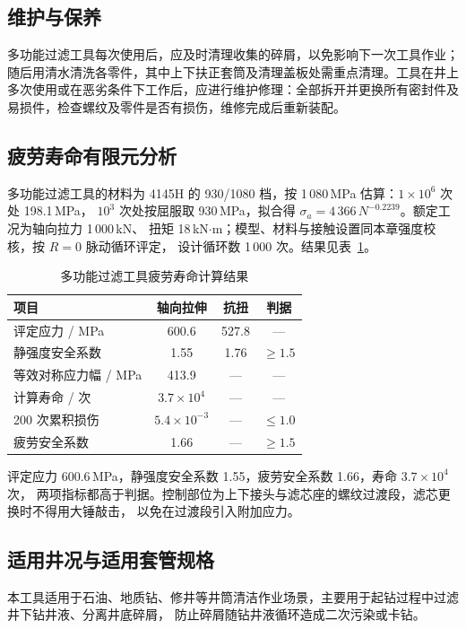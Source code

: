 \subsection{维护与保养}

多功能过滤工具每次使用后，应及时清理收集的碎屑，以免影响下一次工具作业；随后用清水清洗各零件，其中上下扶正套筒及清理盖板处需重点清理。工具在井上多次使用或在恶劣条件下工作后，应进行维护修理：全部拆开并更换所有密封件及易损件，检查螺纹及零件是否有损伤，维修完成后重新装配。


\subsection{疲劳寿命有限元分析}
多功能过滤工具的材料为 4145H 的 930/1080 档，按 1\,080\,MPa 估算：$1\times10^{6}$ 次处 198.1\,MPa，
$10^{3}$ 次处按屈服取 930\,MPa，拟合得 $\sigma_a=4\,366\,N^{-0.2239}$。额定工况为轴向拉力 1\,000\,kN、
扭矩 18\,kN$\cdot$m；模型、材料与接触设置同本章强度校核，按 $R=0$ 脉动循环评定，
设计循环数 1\,000 次。结果见表~\ref{tab:fatigue_filter}。

\begin{table}[htbp]
\centering
\caption{多功能过滤工具疲劳寿命计算结果}
\label{tab:fatigue_filter}
\begin{tabular}{lccc}
\hline
项目 & 轴向拉伸 & 抗扭 & 判据 \\
\hline
评定应力 / MPa & 600.6 & 527.8 & --- \\
静强度安全系数 & 1.55 & 1.76 & $\ge 1.5$ \\
等效对称应力幅 / MPa & 413.9 & --- & --- \\
计算寿命 / 次 & $3.7\times10^{4}$ & --- & --- \\
200 次累积损伤 & $5.4\times10^{-3}$ & --- & $\le 1.0$ \\
疲劳安全系数 & 1.66 & --- & $\ge 1.5$ \\
\hline
\end{tabular}
\end{table}

评定应力 600.6\,MPa，静强度安全系数 1.55，疲劳安全系数 1.66，寿命 $3.7\times10^{4}$ 次，
两项指标都高于判据。控制部位为上下接头与滤芯座的螺纹过渡段，滤芯更换时不得用大锤敲击，
以免在过渡段引入附加应力。

\subsection{适用井况与适用套管规格}

本工具适用于石油、地质钻、修井等井筒清洁作业场景，主要用于起钻过程中过滤井下钻井液、分离井底碎屑，
防止碎屑随钻井液循环造成二次污染或卡钻。

